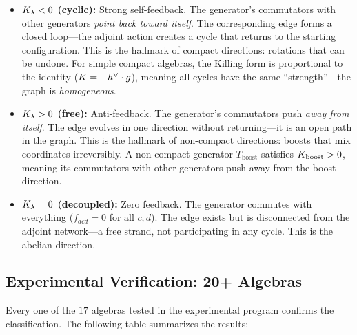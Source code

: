\begin{itemize}
    \item \textbf{$K_\lambda < 0$ (cyclic):} Strong self-feedback. The generator's commutators with other generators \emph{point back toward itself}. The corresponding edge forms a closed loop---the adjoint action creates a cycle that returns to the starting configuration. This is the hallmark of compact directions: rotations that can be undone. For simple compact algebras, the Killing form is proportional to the identity ($K = -h^\vee \cdot g$), meaning all cycles have the same ``strength''---the graph is \emph{homogeneous}.
    
    \item \textbf{$K_\lambda > 0$ (free):} Anti-feedback. The generator's commutators push \emph{away from itself}. The edge evolves in one direction without returning---it is an open path in the graph. This is the hallmark of non-compact directions: boosts that mix coordinates irreversibly. A non-compact generator $T_{\mathrm{boost}}$ satisfies $K_{\mathrm{boost}} > 0$, meaning its commutators with other generators push away from the boost direction.
    
    \item \textbf{$K_\lambda = 0$ (decoupled):} Zero feedback. The generator commutes with everything ($f_{acd} = 0$ for all $c, d$). The edge exists but is disconnected from the adjoint network---a free strand, not participating in any cycle. This is the abelian direction.
\end{itemize}

\subsection{Experimental Verification: 20+ Algebras}\label{sec:experimental_verification}

Every one of the $17$ algebras tested in the experimental program confirms the classification. The following table summarizes the results:

